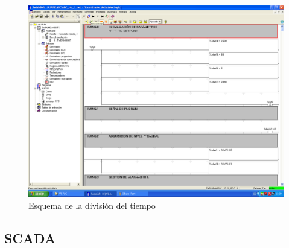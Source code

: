 \begin{figure}[ht!]
	\centering
	\includegraphics[scale=0.3]{Anexos/images/twidosoftdesc.PNG}
	\caption{Esquema de la división del tiempo}
	\label{img:twidosoftdesc}
\end{figure}

\subsection{SCADA}